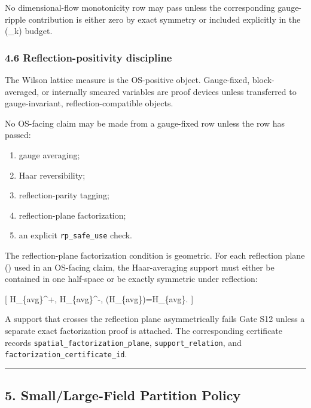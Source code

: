 \documentclass[
]{article}
\providecommand{\tightlist}{%
  \setlength{\itemsep}{0pt}\setlength{\parskip}{0pt}}
\begin{document}
No dimensional-flow monotonicity row may pass unless the corresponding
gauge-ripple contribution is either zero by exact symmetry or included
explicitly in the (\Delta\_k) budget.

\subsubsection{4.6 Reflection-positivity
discipline}\label{reflection-positivity-discipline}

The Wilson lattice measure is the OS-positive object. Gauge-fixed,
block-averaged, or internally smeared variables are proof devices unless
transferred to gauge-invariant, reflection-compatible objects.

No OS-facing claim may be made from a gauge-fixed row unless the row has
passed:

\begin{enumerate}
\def\labelenumi{\arabic{enumi}.}
\tightlist
\item
  gauge averaging;
\item
  Haar reversibility;
\item
  reflection-parity tagging;
\item
  reflection-plane factorization;
\item
  an explicit \texttt{rp\_safe\_use} check.
\end{enumerate}

The reflection-plane factorization condition is geometric. For each
reflection plane (\Pi) used in an OS-facing claim, the Haar-averaging
support must either be contained in one half-space or be exactly
symmetric under reflection:

{[} H\_\{\rm avg\}\subset \Pi\^{}+, \qquad
H\_\{\rm avg\}\subset \Pi\^{}-, \qquad {} \qquad
\theta(H\_\{\rm avg\})=H\_\{\rm avg\}. {]}

A support that crosses the reflection plane asymmetrically fails Gate
S12 unless a separate exact factorization proof is attached. The
corresponding certificate records
\texttt{spatial\_factorization\_plane}, \texttt{support\_relation}, and
\texttt{factorization\_certificate\_id}.

\begin{center}\rule{0.5\linewidth}{0.5pt}\end{center}

\subsection{5. Small/Large-Field Partition
Policy}\label{smalllarge-field-partition-policy}
\end{document}
